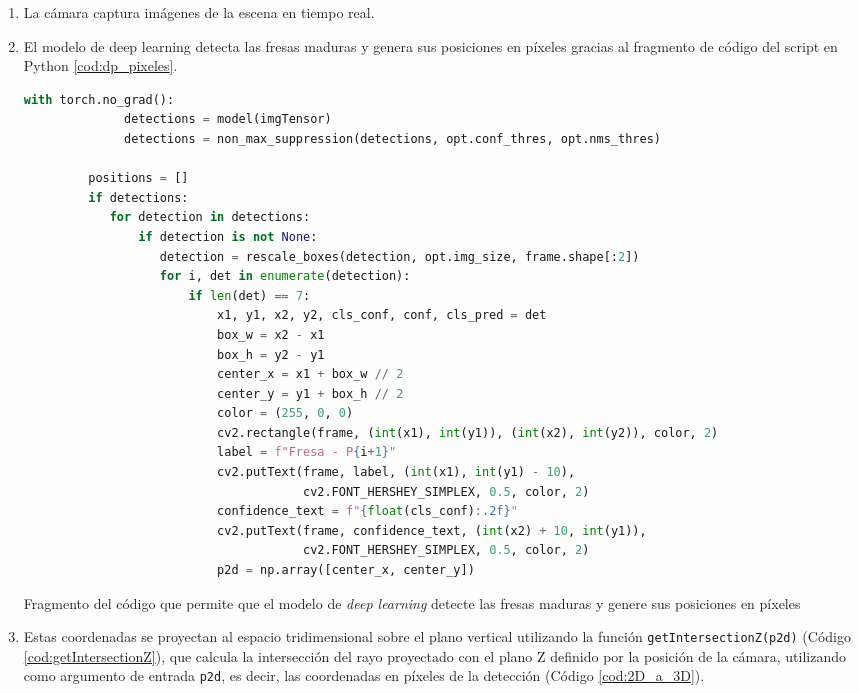 \begin{enumerate}
  \item La cámara captura imágenes de la escena en tiempo real.
  \item El modelo de deep learning detecta las fresas maduras y genera sus posiciones en píxeles gracias al fragmento de código del script en Python \ref{cod:dp_pixeles}.    
    \begin{code}[H]
      \begin{lstlisting}[language=Python] 
         with torch.no_grad():
              detections = model(imgTensor)
              detections = non_max_suppression(detections, opt.conf_thres, opt.nms_thres)

         positions = []
         if detections:
            for detection in detections:
                if detection is not None:
                   detection = rescale_boxes(detection, opt.img_size, frame.shape[:2])
                   for i, det in enumerate(detection):
                       if len(det) == 7:  
                           x1, y1, x2, y2, cls_conf, conf, cls_pred = det
                           box_w = x2 - x1
                           box_h = y2 - y1
                           center_x = x1 + box_w // 2
                           center_y = y1 + box_h // 2
                           color = (255, 0, 0)
                           cv2.rectangle(frame, (int(x1), int(y1)), (int(x2), int(y2)), color, 2)
                           label = f"Fresa - P{i+1}"
                           cv2.putText(frame, label, (int(x1), int(y1) - 10),
                                       cv2.FONT_HERSHEY_SIMPLEX, 0.5, color, 2)
                           confidence_text = f"{float(cls_conf):.2f}"
                           cv2.putText(frame, confidence_text, (int(x2) + 10, int(y1)),
                                       cv2.FONT_HERSHEY_SIMPLEX, 0.5, color, 2)
                           p2d = np.array([center_x, center_y])            
      \end{lstlisting}
      \caption{Fragmento del código que permite que el modelo de \textit{deep learning} detecte las fresas maduras y genere sus posiciones en píxeles}
      \label{cod:dp_pixeles}
    \end{code}

  \item Estas coordenadas se proyectan al espacio tridimensional sobre el plano vertical utilizando la función \texttt{getIntersectionZ(p2d)} (Código \ref{cod:getIntersectionZ}), que calcula la intersección del rayo proyectado con el plano Z definido por la posición de la cámara, utilizando como argumento de entrada \texttt{p2d}, es decir, las coordenadas en píxeles de la detección (Código \ref{cod:2D_a_3D}).
 

\end{enumerate}
